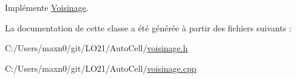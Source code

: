 Implémente \mbox{\hyperlink{class_voisinage_a9853dfde1a68f5bb6333a8db001411a0}{Voisinage}}.



La documentation de cette classe a été générée à partir des fichiers suivants \+:\begin{DoxyCompactItemize}
\item 
C\+:/\+Users/maxn0/git/\+L\+O21/\+Auto\+Cell/\mbox{\hyperlink{voisinage_8h}{voisinage.\+h}}\item 
C\+:/\+Users/maxn0/git/\+L\+O21/\+Auto\+Cell/\mbox{\hyperlink{voisinage_8cpp}{voisinage.\+cpp}}\end{DoxyCompactItemize}

